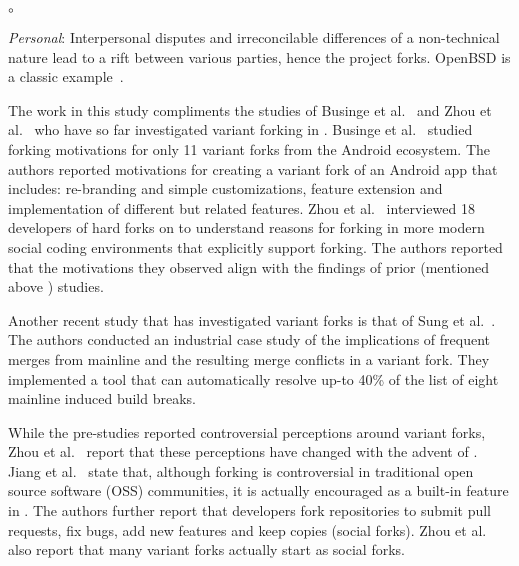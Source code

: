 \begin{list}{$\circ$}{}
\item \textit{Personal}: Interpersonal disputes and irreconcilable differences of a non-technical nature lead to a rift between various parties, hence the project forks. OpenBSD is a classic example~\cite{Zhou:2020}.


\end{list}

The work in this study compliments the studies of Businge et al.~\cite{businge2018appfamilies} and  Zhou et al.~\cite{Zhou:2020} who have so far investigated variant forking in \gh. Businge et al.~\cite{businge2018appfamilies} studied forking motivations for only 11 variant forks from the Android ecosystem. The authors reported motivations for creating a variant fork of an Android app that includes: re-branding and simple customizations, feature extension and implementation of different but related features.  
Zhou et al.~\cite{Zhou:2020} interviewed 18 developers of hard forks on \gh to understand reasons for forking in more modern social coding environments that explicitly support forking. The authors reported that the motivations they observed align with the findings of prior (mentioned above ) studies. 

Another recent study that has investigated variant forks is that of Sung et al.~\cite{sung:ICSE:2020}. The authors conducted an industrial case study of the implications of frequent merges from mainline and the resulting merge conflicts in a variant fork. They implemented a tool that can automatically resolve up-to 40\% of the list of eight mainline induced build breaks. 

While the pre-\gh studies reported controversial perceptions around variant forks, Zhou et al.~\cite{Zhou:2020} report that these perceptions have changed with the advent of \gh. Jiang et al.~\cite{Lo:2017} state that, although forking is controversial in traditional open source software (OSS) communities, it is actually encouraged as a built-in feature in \gh. The authors further report that developers fork repositories to submit pull requests, fix bugs, add new features and keep copies (social forks).
Zhou et al.~\cite{Zhou:2020} also report that many variant forks actually start as social forks. 


